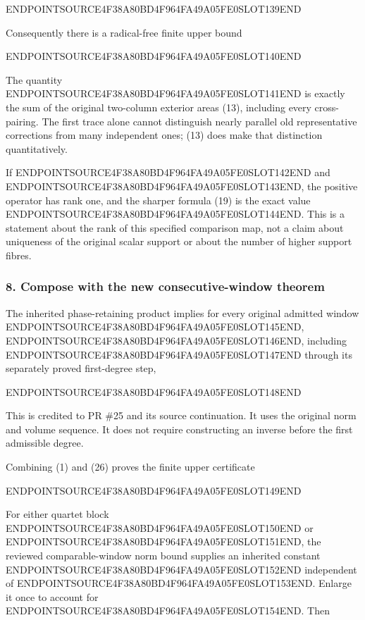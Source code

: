 ENDPOINTSOURCE4F38A80BD4F964FA49A05FE0SLOT139END

Consequently there is a radical-free finite upper bound

ENDPOINTSOURCE4F38A80BD4F964FA49A05FE0SLOT140END

The quantity ENDPOINTSOURCE4F38A80BD4F964FA49A05FE0SLOT141END is exactly the sum of the original two-column exterior areas (13), including every cross-pairing. The first trace alone cannot distinguish nearly parallel old representative corrections from many independent ones; (13) does make that distinction quantitatively.

If ENDPOINTSOURCE4F38A80BD4F964FA49A05FE0SLOT142END and ENDPOINTSOURCE4F38A80BD4F964FA49A05FE0SLOT143END, the positive operator has rank one, and the sharper formula (19) is the exact value ENDPOINTSOURCE4F38A80BD4F964FA49A05FE0SLOT144END. This is a statement about the rank of this specified comparison map, not a claim about uniqueness of the original scalar support or about the number of higher support fibres.

\subsubsection{8. Compose with the new consecutive-window theorem}\label{endpoint-relation_moment_original--compose-with-the-new-consecutive-window-theorem}

The inherited phase-retaining product implies for every original admitted window ENDPOINTSOURCE4F38A80BD4F964FA49A05FE0SLOT145END, ENDPOINTSOURCE4F38A80BD4F964FA49A05FE0SLOT146END, including ENDPOINTSOURCE4F38A80BD4F964FA49A05FE0SLOT147END through its separately proved first-degree step,

ENDPOINTSOURCE4F38A80BD4F964FA49A05FE0SLOT148END

This is credited to PR \#25 and its source continuation. It uses the original norm and volume sequence. It does not require constructing an inverse before the first admissible degree.

Combining (1) and (26) proves the finite upper certificate

ENDPOINTSOURCE4F38A80BD4F964FA49A05FE0SLOT149END

For either quartet block ENDPOINTSOURCE4F38A80BD4F964FA49A05FE0SLOT150END or ENDPOINTSOURCE4F38A80BD4F964FA49A05FE0SLOT151END, the reviewed comparable-window norm bound supplies an inherited constant ENDPOINTSOURCE4F38A80BD4F964FA49A05FE0SLOT152END independent of ENDPOINTSOURCE4F38A80BD4F964FA49A05FE0SLOT153END. Enlarge it once to account for ENDPOINTSOURCE4F38A80BD4F964FA49A05FE0SLOT154END. Then

